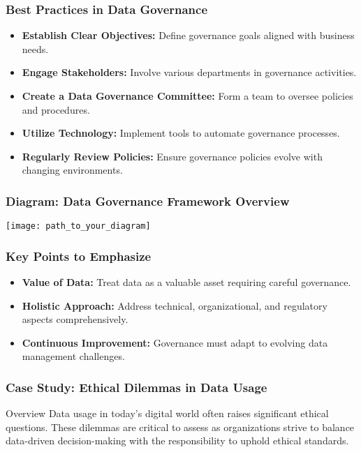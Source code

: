 \documentclass[aspectratio=169]{beamer}
\begin{document}
\begin{frame}[fragile]
    \frametitle{Best Practices in Data Governance}
    \begin{itemize}
        \item \textbf{Establish Clear Objectives:} Define governance goals aligned with business needs.
        \item \textbf{Engage Stakeholders:} Involve various departments in governance activities.
        \item \textbf{Create a Data Governance Committee:} Form a team to oversee policies and procedures.
        \item \textbf{Utilize Technology:} Implement tools to automate governance processes.
        \item \textbf{Regularly Review Policies:} Ensure governance policies evolve with changing environments.
    \end{itemize}
\end{frame}

\begin{frame}[fragile]
    \frametitle{Diagram: Data Governance Framework Overview}
    \begin{center}
        \texttt{[image: path\_to\_your\_diagram]} %
    \end{center}
\end{frame}

\begin{frame}[fragile]
    \frametitle{Key Points to Emphasize}
    \begin{itemize}
        \item \textbf{Value of Data:} Treat data as a valuable asset requiring careful governance.
        \item \textbf{Holistic Approach:} Address technical, organizational, and regulatory aspects comprehensively.
        \item \textbf{Continuous Improvement:} Governance must adapt to evolving data management challenges.
    \end{itemize}
\end{frame}

\begin{frame}[fragile]
    \frametitle{Case Study: Ethical Dilemmas in Data Usage}
    \begin{block}{Overview}
        Data usage in today’s digital world often raises significant ethical questions. These dilemmas are critical to assess as organizations strive to balance data-driven decision-making with the responsibility to uphold ethical standards.
    \end{block}
\end{frame}
\end{document}
